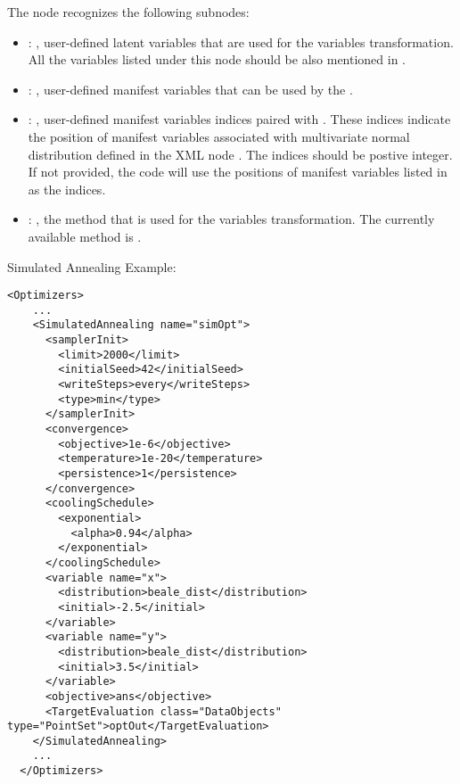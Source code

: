 \begin{itemize}
      The  node recognizes the following subnodes:
      \begin{itemize}
        \item {}: , 
          user-defined latent variables that are used for the variables transformation.
          All the variables listed under this node should be also mentioned in .

        \item {}: , 
          user-defined manifest variables that can be used by the .

        \item {}: , 
          user-defined manifest variables indices paired with .
          These indices indicate the position of manifest variables associated with multivariate
          normal               distribution defined in the XML node .
          The indices should be postive integer. If not provided, the code will use the positions
          of manifest variables listed in  as the indices.

        \item {}: , 
          the method that is used for the variables transformation. The currently available method
          is .
      \end{itemize}
  \end{itemize}

\hspace{24pt}
Simulated Annealing Example:
\begin{lstlisting}[style=XML]
  <Optimizers>
    ...
    <SimulatedAnnealing name="simOpt">
      <samplerInit>
        <limit>2000</limit>
        <initialSeed>42</initialSeed>
        <writeSteps>every</writeSteps>
        <type>min</type>
      </samplerInit>
      <convergence>
        <objective>1e-6</objective>
        <temperature>1e-20</temperature>
        <persistence>1</persistence>
      </convergence>
      <coolingSchedule>
        <exponential>
          <alpha>0.94</alpha>
        </exponential>
      </coolingSchedule>
      <variable name="x">
        <distribution>beale_dist</distribution>
        <initial>-2.5</initial>
      </variable>
      <variable name="y">
        <distribution>beale_dist</distribution>
        <initial>3.5</initial>
      </variable>
      <objective>ans</objective>
      <TargetEvaluation class="DataObjects" type="PointSet">optOut</TargetEvaluation>
    </SimulatedAnnealing>
    ...
  </Optimizers>
\end{lstlisting}



